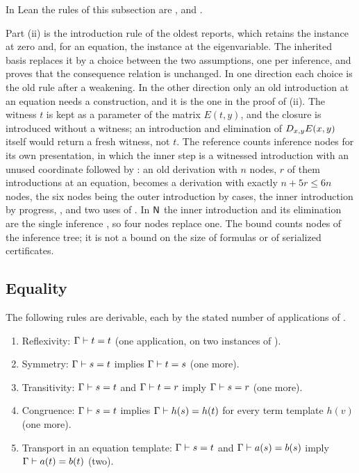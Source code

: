 In Lean the rules of this subsection are , 
and .

\begin{remark}
\label{base:rem:olddi}
Part (ii) is the introduction rule of the oldest reports, which retains the
instance at zero and, for an equation, the instance at the eigenvariable.
The inherited basis replaces it by a choice between the two assumptions, one
per inference, and proves that the consequence relation is unchanged.  In one
direction each choice is the old rule after a weakening.  In the other
direction only an old introduction at an equation needs a construction, and
it is the one in the proof of (ii).  The witness $t$ is kept as a parameter
of the matrix $E(t,y)$, and the closure is introduced without a witness; an
introduction and elimination of $D_{x,y}E(x,y)$ itself would return a fresh
witness, not $t$.  The reference counts inference nodes for its own
presentation, in which the inner step is a witnessed introduction with an
unused coordinate followed by : an old derivation with $n$
nodes, $r$ of them introductions at an equation, becomes a derivation with
exactly $n+5r\le 6n$ nodes, the six nodes being the outer introduction by
cases, the inner introduction by progress, ,  and
two uses of .  In $\mathsf{N}$ the inner introduction and its
elimination are the single inference , so four nodes replace
one.  The bound counts nodes of the inference tree; it is not a bound on the
size of formulas or of serialized certificates.
\end{remark}

\subsection{Equality}

\begin{lemma}
\label{base:lem:eq}
The following rules are derivable, each by the stated number of applications
of .
\begin{enumerate}[label=\textup{(\roman*)}]
\item Reflexivity: $\Gamma\vdash t=t$ (one application, on two instances of
 ).
\item Symmetry: $\Gamma\vdash s=t$ implies $\Gamma\vdash t=s$ (one more).
\item Transitivity: $\Gamma\vdash s=t$ and $\Gamma\vdash t=r$ imply
 $\Gamma\vdash s=r$ (one more).
\item Congruence: $\Gamma\vdash s=t$ implies $\Gamma\vdash h(s)=h(t)$ for
 every term template $h(v)$ (one more).
\item Transport in an equation template: $\Gamma\vdash s=t$ and
 $\Gamma\vdash a(s)=b(s)$ imply $\Gamma\vdash a(t)=b(t)$ (two).
\end{enumerate}
\end{lemma}

